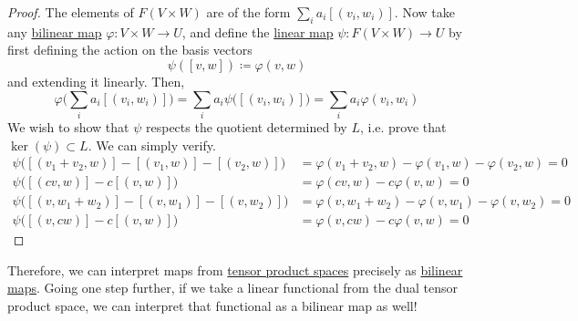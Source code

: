 	\begin{proof}
		The elements of $F(V \times W)$ are of the form $\sum_i a_i [(v_i, w_i)]$. Now take any \hyperref[def:bilinear-map]{bilinear map} $\varphi: V \times W \to U$, and define the \hyperref[def:linear_map]{linear map} $\psi: F(V \times W) \to U$ by first defining the action on the basis vectors 
		\begin{equation}
			\psi ([v, w]) \coloneqq \varphi(v, w)
		\end{equation}
		and extending it linearly. Then, 
		\begin{equation}
			\varphi \bigg( \sum_i a_i [(v_i, w_i)] \bigg) = \sum_i a_i \psi \big( [(v_i, w_i)] \big) = \sum_i a_i \varphi(v_i, w_i)
		\end{equation}
		We wish to show that $\psi$ respects the quotient determined by $L$, i.e. prove that $\ker(\psi) \subset L$. We can simply verify. 
		\begin{align}
			\psi \big( [(v_1 + v_2, w)] - [(v_1, w)] - [(v_2, w)] \big) 
																							& = \varphi(v_1 + v_2, w) - \varphi(v_1, w) - \varphi(v_2, w) = 0 \\ 
			\psi \big( [(cv, w)] - c [(v, w)] \big) & = \varphi(cv, w) - c \varphi(v, w) = 0 \\ 
			\psi \big( [(v, w_1 + w_2)] - [(v, w_1)] - [(v, w_2)] \big) 
																							& =  \varphi(v, w_1 + w_2) - \varphi(v, w_1) - \varphi(v, w_2) = 0 \\ 
			\psi \big( [(v, cw)] - c[(v, w)] \big) & = \varphi(v, cw) - c \varphi(v, w) = 0
		\end{align}
	\end{proof}

	Therefore, we can interpret maps from \hyperref[def:tensor]{tensor product spaces} precisely as \hyperref[def:bilinear-map]{bilinear maps}. Going one step further, if we take a linear functional from the dual tensor product space, we can interpret that functional as a bilinear map as well! 

